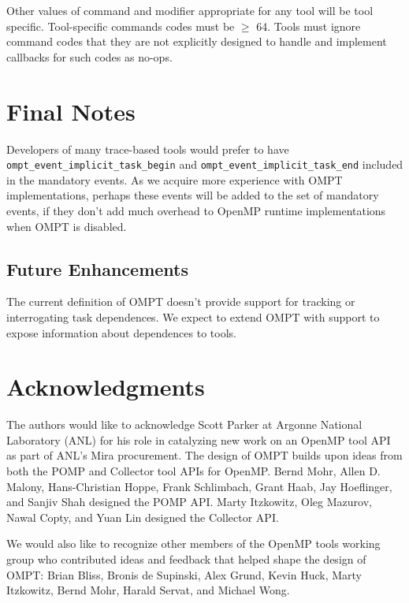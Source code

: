 \documentclass{article}
\begin{document}
{Other values of command  and modifier appropriate for any tool will be tool specific. Tool-specific commands codes must be $\geq$ 64. Tools must ignore command codes that they are not explicitly designed to handle and implement callbacks for such codes as no-ops.


\section{Final Notes}
\label{sec:notes}
Developers of many trace-based tools would prefer to have  \verb|ompt_event_implicit_task_begin| and \verb|ompt_event_implicit_task_end| included in the mandatory events. As we acquire more experience with OMPT implementations, perhaps these events will be added to the set of mandatory events, if they don't add much overhead to OpenMP runtime implementations when OMPT is disabled.

\subsection{Future Enhancements}
The current definition of OMPT doesn't provide support for tracking or interrogating task dependences.  We expect to extend OMPT with support to expose information about dependences to tools.

\section*{Acknowledgments}

The authors would like to acknowledge Scott Parker at Argonne National Laboratory (ANL) for 
his role in catalyzing new work on an OpenMP tool API as part of ANL's Mira procurement.
The design of OMPT builds upon ideas from both the POMP and Collector tool APIs for OpenMP. 
Bernd Mohr, Allen D. Malony, Hans-Christian Hoppe, Frank Schlimbach, 
Grant Haab, Jay Hoeflinger, and Sanjiv Shah designed the POMP API. 
Marty Itzkowitz, Oleg Mazurov, Nawal Copty, and Yuan Lin designed the Collector API.

We would also like to recognize other members of the OpenMP tools working group who contributed ideas and feedback that helped shape the design of  OMPT: Brian Bliss, Bronis de Supinski, Alex Grund, Kevin Huck, Marty Itzkowitz, Bernd Mohr, Harald Servat, and Michael Wong.

 \clearpage
 
 


\appendix
\clearpage


}
\end{document}
